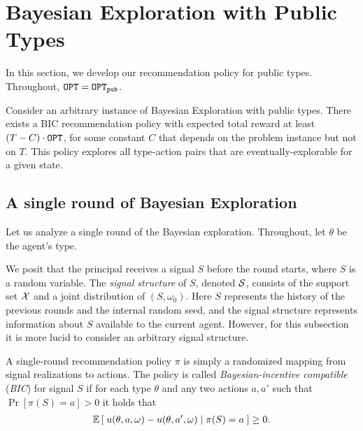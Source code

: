 
\section{Bayesian Exploration with Public Types}
\label{sec:public}

In this section, we develop our recommendation policy for public types. Throughout, $\OPT = \OPTpub$.

\begin{theorem}
\label{thm:public}
Consider an arbitrary instance of Bayesian Exploration with public types.
There exists a BIC recommendation policy with expected total reward at least $\left(T - C \right) \cdot \OPT$, for some constant $C$ that depends on the problem instance but not on $T$. This policy explores all type-action pairs that are eventually-explorable for a given state.
\end{theorem}

\subsection{A single round of Bayesian Exploration}
\label{sec:public_single}

Let us analyze a single round of the Bayesian exploration. Throughout, let $\theta$ be the agent's type.

We posit that the principal receives a signal $S$ before the round starts, where $S$ is a random variable.  The \emph{signal structure} of $S$, denoted $\S$, consists of the support set $\X$ and a joint distribution of $(S, \omega_0)$. Here $S$ represents the history of the previous rounds and the internal random seed, and the signal structure represents information about $S$ available to the current agent. However, for this subsection it is more lucid to consider an arbitrary signal structure.

A single-round recommendation policy $\pi$ is simply a randomized mapping from signal realizations to actions. The policy is called \emph{Bayesian-incentive compatible} (\emph{BIC}) for signal $S$ if for each type $\theta$ and any two actions $a,a'$ such that $\Pr[\pi(S) = a] > 0$ it holds that
\begin{align}\label{eq:model-BIC-single-round}
\E\left[\; u(\theta,a,\omega) - u(\theta,a',\omega) \mid \pi(S) =a\;\right] \geq 0.
\end{align}

